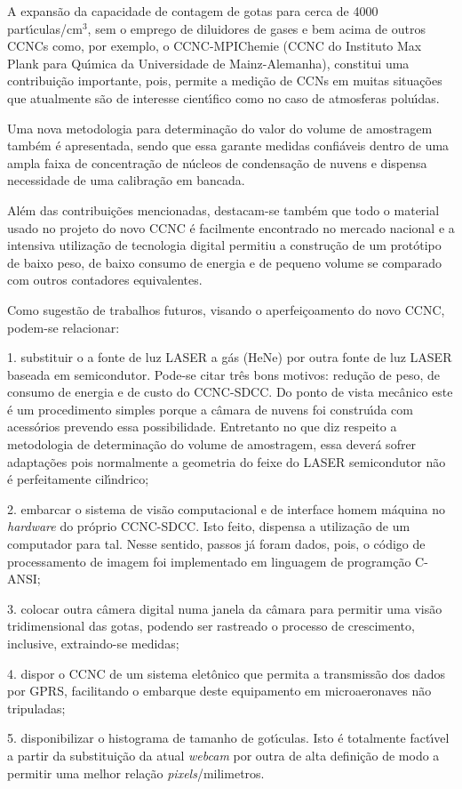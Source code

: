 A expans\~{a}o da capacidade de contagem de gotas para cerca de 4000 part\'{\i}culas/cm$^3$, sem o emprego de diluidores de gases e bem acima de outros CCNCs como, por exemplo, o CCNC-MPIChemie (CCNC do Instituto Max Plank para Qu\'{\i}mica da Universidade de Mainz-Alemanha), constitui uma contribui\c{c}\~{a}o importante, pois, permite a medi\c{c}\~{a}o de CCNs em muitas situa\c{c}\~{o}es que atualmente s\~{a}o de interesse cient\'{\i}fico como no caso de atmosferas polu\'{\i}das.
	
Uma nova metodologia para determina\c{c}\~{a}o do valor do volume de amostragem tamb\'{e}m \'{e} apresentada, sendo que essa garante medidas confi\'{a}veis dentro de uma ampla faixa de concentra\c{c}\~{a}o de n\'{u}cleos  de condensa\c{c}\~{a}o de nuvens e dispensa necessidade de uma calibra\c{c}\~{a}o em bancada.
	
Al\'{e}m das contribui\c{c}\~{o}es mencionadas, destacam-se tamb\'{e}m que todo o material usado no projeto do novo CCNC \'{e} facilmente encontrado no mercado nacional e a intensiva utiliza\c{c}\~{a}o de tecnologia digital permitiu a constru\c{c}\~{a}o de um prot\'{o}tipo de baixo peso, de baixo consumo de energia e de pequeno volume se comparado com outros contadores equivalentes.

Como sugest\~{a}o de trabalhos futuros, visando o aperfei\c{c}oamento do novo CCNC, podem-se relacionar:

1.	substituir o a fonte de luz LASER a g\'{a}s (HeNe) por outra fonte de luz LASER baseada em semicondutor. Pode-se citar tr\^{e}s bons motivos: redu\c{c}\~{a}o de peso, de consumo de energia e de custo do CCNC-SDCC. Do ponto de vista mec\^{a}nico este \'{e} um procedimento simples porque a c\^{a}mara de nuvens foi constru\'{\i}da com acess\'{o}rios prevendo essa possibilidade. Entretanto no que diz respeito a metodologia de determina\c{c}\~{a}o do volume de amostragem, essa dever\'{a} sofrer adapta\c{c}\~{o}es pois normalmente a geometria do feixe do LASER semicondutor n\~{a}o \'{e} perfeitamente cil\'{\i}ndrico;

2.	embarcar o sistema de vis\~{a}o computacional e de interface homem m\'{a}quina no \emph{hardware} do pr\'{o}prio CCNC-SDCC. Isto feito, dispensa a utiliza\c{c}\~{a}o de um computador para tal. Nesse sentido, passos j\'{a} foram dados, pois, o c\'{o}digo de processamento de imagem foi implementado em linguagem de program\c{c}\~{a}o C-ANSI;

3.	colocar outra c\^{a}mera digital numa janela da c\^{a}mara para permitir uma vis\~{a}o tridimensional das gotas, podendo ser rastreado o processo de crescimento, inclusive, extraindo-se medidas;

4.	dispor o CCNC de um sistema elet\^{o}nico que permita a transmiss\~{a}o dos dados por GPRS, facilitando o embarque deste equipamento em microaeronaves n\~{a}o tripuladas;

5. disponibilizar o histograma de tamanho de got\'{\i}culas. Isto \'{e} totalmente fact\'{\i}vel a partir da substitui\c{c}\~{a}o da atual \emph{webcam} por outra de alta defini\c{c}\~{a}o de modo a permitir uma melhor rela\c{c}\~{a}o  \emph{pixels}/milimetros.
